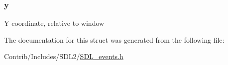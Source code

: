 \subsubsection[{\texorpdfstring{y}{y}}]{ y}\hypertarget{struct_s_d_l___mouse_button_event_ae6c55103b58b9a5b746ae4f6fbc9c901}{}\label{struct_s_d_l___mouse_button_event_ae6c55103b58b9a5b746ae4f6fbc9c901}
Y coordinate, relative to window 

The documentation for this struct was generated from the following file\+:\begin{DoxyCompactItemize}
\item 
Contrib/\+Includes/\+S\+D\+L2/\hyperlink{_s_d_l__events_8h}{S\+D\+L\+\_\+events.\+h}\end{DoxyCompactItemize}
